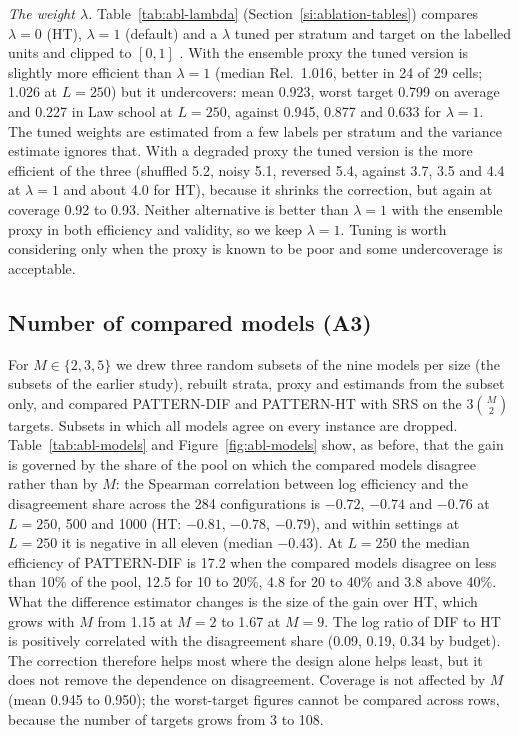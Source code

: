 \documentclass[pdflatex,sn-mathphys-num,iicol]{sn-jnl}
\theoremstyle{thmstyleone}
\theoremstyle{thmstyletwo}
\theoremstyle{thmstylethree}
\begin{document}
\emph{The weight $\lambda$.} Table~\ref{tab:abl-lambda} (Section~\ref{si:ablation-tables}) compares $\lambda=0$ (HT), $\lambda=1$ (default) and a $\lambda$ tuned per stratum and target on the labelled units and clipped to $[0,1]$ \citep[as in PPI++ and StratPPI;][]{angelopoulos2026ppipp,fisch2024stratppi}. With the ensemble proxy the tuned version is slightly more efficient than $\lambda=1$ (median Rel.\ 1.016, better in 24 of 29 cells; 1.026 at $L=250$) but it undercovers: mean 0.923, worst target 0.799 on average and 0.227 in Law school at $L=250$, against 0.945, 0.877 and 0.633 for $\lambda=1$. The tuned weights are estimated from a few labels per stratum and the variance estimate ignores that. With a degraded proxy the tuned version is the more efficient of the three (shuffled 5.2, noisy 5.1, reversed 5.4, against 3.7, 3.5 and 4.4 at $\lambda=1$ and about 4.0 for HT), because it shrinks the correction, but again at coverage 0.92 to 0.93. Neither alternative is better than $\lambda=1$ with the ensemble proxy in both efficiency and validity, so we keep $\lambda=1$. Tuning is worth considering only when the proxy is known to be poor and some undercoverage is acceptable.

\subsection{Number of compared models (A3)}

For $M\in\{2,3,5\}$ we drew three random subsets of the nine models per size (the subsets of the earlier study), rebuilt strata, proxy and estimands from the subset only, and compared PATTERN-DIF and PATTERN-HT with SRS on the $3\binom{M}{2}$ targets. Subsets in which all models agree on every instance are dropped. Table~\ref{tab:abl-models} and Figure~\ref{fig:abl-models} show, as before, that the gain is governed by the share of the pool on which the compared models disagree rather than by $M$: the Spearman correlation between log efficiency and the disagreement share across the 284 configurations is $-0.72$, $-0.74$ and $-0.76$ at $L=250$, 500 and 1000 (HT: $-0.81$, $-0.78$, $-0.79$), and within settings at $L=250$ it is negative in all eleven (median $-0.43$). At $L=250$ the median efficiency of PATTERN-DIF is 17.2 when the compared models disagree on less than 10\% of the pool, 12.5 for 10 to 20\%, 4.8 for 20 to 40\% and 3.8 above 40\%. What the difference estimator changes is the size of the gain over HT, which grows with $M$ from 1.15 at $M=2$ to 1.67 at $M=9$. The log ratio of DIF to HT is positively correlated with the disagreement share (0.09, 0.19, 0.34 by budget). The correction therefore helps most where the design alone helps least, but it does not remove the dependence on disagreement. Coverage is not affected by $M$ (mean 0.945 to 0.950); the worst-target figures cannot be compared across rows, because the number of targets grows from 3 to 108.
\end{document}
